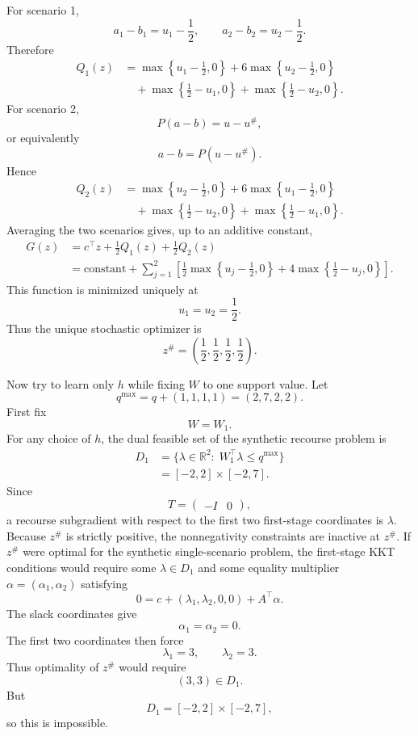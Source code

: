 \documentclass{article}
\newcommand{\R}{\mathbb{R}}
\newcommand{\1}{\mathbf{1}}
\theoremstyle{plain}
\theoremstyle{definition}
\theoremstyle{remark}
\begin{document}
For scenario 1,
\[
a_1-b_1=u_1-\frac{1}{2},
\qquad
a_2-b_2=u_2-\frac{1}{2}.
\]
Therefore
\[
\begin{aligned}
Q_1(z)
&=\max\left\{u_1-\frac{1}{2},0\right\}
+6\max\left\{u_2-\frac{1}{2},0\right\}\\
&\quad
+\max\left\{\frac{1}{2}-u_1,0\right\}
+\max\left\{\frac{1}{2}-u_2,0\right\}.
\end{aligned}
\]
For scenario 2,
\[
P(a-b)=u-u^\#,
\]
or equivalently
\[
a-b=P(u-u^\#).
\]
Hence
\[
\begin{aligned}
Q_2(z)
&=\max\left\{u_2-\frac{1}{2},0\right\}
+6\max\left\{u_1-\frac{1}{2},0\right\}\\
&\quad
+\max\left\{\frac{1}{2}-u_2,0\right\}
+\max\left\{\frac{1}{2}-u_1,0\right\}.
\end{aligned}
\]
Averaging the two scenarios gives, up to an additive constant,
\[
\begin{aligned}
G(z)
&=c^\top z+\frac{1}{2}Q_1(z)+\frac{1}{2}Q_2(z)\\
&=\mathrm{constant}
+\sum_{j=1}^{2}\left[
\frac{1}{2}\max\left\{u_j-\frac{1}{2},0\right\}
+4\max\left\{\frac{1}{2}-u_j,0\right\}
\right].
\end{aligned}
\]
This function is minimized uniquely at
\[
u_1=u_2=\frac{1}{2}.
\]
Thus the unique stochastic optimizer is
\[
z^\#=\left(\frac{1}{2},\frac{1}{2},\frac{1}{2},\frac{1}{2}\right).
\]

Now try to learn only $h$ while fixing $W$ to one support value. Let
\[
q^{\max}=q+(1,1,1,1)=(2,7,2,2).
\]
First fix
\[
W=W_1.
\]
For any choice of $h$, the dual feasible set of the synthetic recourse problem is
\[
\begin{aligned}
D_1
&=\{\lambda\in\R^2:\; W_1^\top\lambda\leq q^{\max}\}\\
&=[-2,2]\times[-2,7].
\end{aligned}
\]
Since
\[
T=\begin{pmatrix}-I&0\end{pmatrix},
\]
a recourse subgradient with respect to the first two first-stage coordinates is $\lambda$. Because $z^\#$ is strictly positive, the nonnegativity constraints are inactive at $z^\#$. If $z^\#$ were optimal for the synthetic single-scenario problem, the first-stage KKT conditions would require some $\lambda\in D_1$ and some equality multiplier $\alpha=(\alpha_1,\alpha_2)$ satisfying
\[
0=c+(\lambda_1,\lambda_2,0,0)+A^\top\alpha.
\]
The slack coordinates give
\[
\alpha_1=\alpha_2=0.
\]
The first two coordinates then force
\[
\lambda_1=3,
\qquad
\lambda_2=3.
\]
Thus optimality of $z^\#$ would require
\[
(3,3)\in D_1.
\]
But
\[
D_1=[-2,2]\times[-2,7],
\]
so this is impossible.
\end{document}
